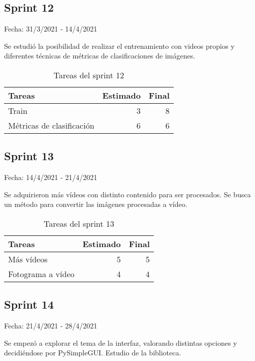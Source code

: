 \subsection{Sprint 12}

    Fecha: 31/3/2021 - 14/4/2021

    Se estudió la posibilidad de realizar el entrenamiento con videos propios y diferentes técnicas de métricas de clasificaciones de imágenes.
  
    \begin{table}[H]
    	 \begin{tabularx}{\linewidth}{X r r}
    	 	\toprule \textbf{Tareas} & \textbf{Estimado} & \textbf{Final}\\
    	 	\toprule
     		Train  & 3 & 8 \\
    		Métricas de clasificación & 6 & 6\\
    	 	\bottomrule
    	 \end{tabularx}
    	 \caption{Tareas del sprint 12}
    \end{table}

\subsection{Sprint 13}

    Fecha: 14/4/2021 - 21/4/2021
    
    Se adquirieron más vídeos con distinto contenido para ser procesados. Se busca un método para convertir las imágenes procesadas a vídeo.
    
    \begin{table}[H]
    	 \begin{tabularx}{\linewidth}{X r r}
    	 	\toprule \textbf{Tareas} & \textbf{Estimado} & \textbf{Final}\\
    	 	\toprule
         	Más vídeos   & 5 & 5 \\
		    Fotograma a vídeo & 4 & 4\\
    	 	\bottomrule
    	 \end{tabularx}
    	 \caption{Tareas del sprint 13}
    \end{table}

\subsection{Sprint 14}

    Fecha: 21/4/2021 - 28/4/2021
    
    Se empezó a explorar el tema de la interfaz, valorando distintas opciones y decidiéndose por PySimpleGUI. Estudio de la biblioteca.
    
